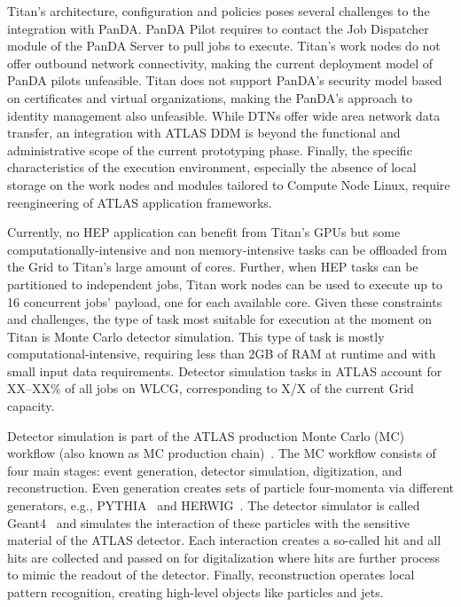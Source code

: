 Titan's architecture, configuration and policies poses several challenges to the
integration with PanDA. PanDA Pilot requires to contact the Job Dispatcher
module of the PanDA Server to pull jobs to execute. Titan's work nodes do not
offer outbound network connectivity, making the current deployment model of
PanDA pilots unfeasible. Titan does not support PanDA's security model based on
certificates and virtual organizations, making the PanDA's approach to identity
management also unfeasible. While DTNs offer wide area network data transfer, an
integration with ATLAS DDM is beyond the functional and administrative scope of
the current prototyping phase. Finally, the specific characteristics of the
execution environment, especially the absence of local storage on the work nodes
and modules tailored to Compute Node Linux, require reengineering of ATLAS
application frameworks.

Currently, no HEP application can benefit from Titan's GPUs but some
computationally-intensive and non memory-intensive tasks can be offloaded from
the Grid to Titan's large amount of cores. Further, when HEP tasks can be
partitioned to independent jobs, Titan work nodes can be used to execute up to
16 concurrent jobs' payload, one for each available core. Given these
constraints and challenges, the type of task most suitable for execution at the moment on Titan is Monte Carlo
detector simulation.
This type of task is mostly computational-intensive, requiring less than 2GB of
RAM at runtime and with small input data requirements. Detector simulation tasks
in ATLAS account for XX--XX\% of all jobs on WLCG, corresponding to X/X of the
current Grid capacity.



Detector simulation is part of the ATLAS production Monte Carlo (MC) workflow
(also known as MC production
chain)~\cite{rimoldi2006atlas,de2013delphes,ritsch2014atlas}. The MC workflow
consists of four main stages: event generation, detector simulation,
digitization, and reconstruction. Even generation creates sets of particle
four-momenta via different generators, e.g., PYTHIA~\cite{sjostrand2006pythia}
and HERWIG~\cite{corcella2001herwig}. The detector simulator is called
Geant4~\cite{agostinelli2003geant4} and simulates the interaction of these
particles with the sensitive material of the ATLAS detector. Each interaction
creates a so-called hit and all hits are collected and passed on for
digitalization where hits are further process to mimic the readout of the
detector. Finally, reconstruction operates local pattern recognition, creating
high-level objects like particles and jets.

